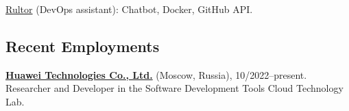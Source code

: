 \documentclass{vl}
\begin{document}
    \href{https://www.rultor.com}{Rultor} (DevOps assistant):
    Chatbot, Docker, GitHub API.

%
%
%
%
%
%
%

    \subsection*{Recent Employments}

    \textbf{\href{https://www.huawei.com}{Huawei Technologies Co., Ltd.}} (Moscow, Russia), 10/2022--present.\newline
    Researcher and Developer in the Software Development Tools Cloud Technology Lab.\newline
\end{document}
